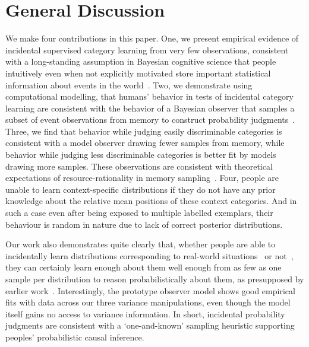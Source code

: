 \documentclass[10pt,letterpaper]{article}
\begin{document}
\section{General Discussion}
We make four contributions in this paper. One, we present empirical evidence of incidental supervised category learning from very few observations, consistent with a long-standing assumption in Bayesian cognitive science that people intuitively even when not explicitly motivated store important statistical information about events in the world~\cite{griffiths2006optimal, stewart2006decision}. Two, we demonstrate using computational modelling, that humans' behavior in tests of incidental category learning are consistent with the behavior of a Bayesian observer that samples a subset of event observations from memory to construct probability judgments~\cite{srivastava2014frugal, zhu2020bayesian}. Three, we find that behavior while judging easily discriminable categories is consistent with a model observer drawing fewer samples from memory, while behavior while judging less discriminable categories is better fit by models drawing more samples. These observations are consistent with theoretical expectations of resource-rationality in memory sampling~\cite{griffiths2015rational, sanborn2016bayesian}. Four, people are unable to learn context-specific distributions if they do not have any prior knowledge about the relative mean positions of these context categories. And in such a case even after being exposed to multiple labelled exemplars, their behaviour is random in nature due to lack of correct posterior distributions.

Our work also demonstrates quite clearly that, whether people are able to incidentally learn distributions corresponding to real-world situations~\cite{hz84} or not~\cite{tvp17}, they can certainly learn enough about them well enough from as few as one sample per distribution to reason probabilistically about them, as presupposed by earlier work~\cite{griffiths2006optimal, stewart2006decision}. Interestingly, the prototype observer model shows good empirical fits with data across our three variance manipulations, even though the model itself gains no access to variance information. In short, incidental probability judgments are consistent with a `one-and-known' sampling heuristic supporting peoples' probabilistic causal inference. 
\end{document}
